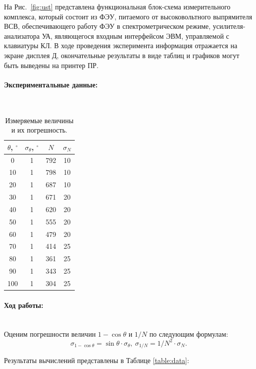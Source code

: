 \documentclass[a4paper, 12pt]{article}
\newcommand{\parag}[1]{\paragraph*{#1:}}
\begin{document}
На Рис.~\ref{fig:ust} представлена функциональная блок-схема измерительного комплекса, который состоит из ФЭУ, питаемого от высоковольтного выпрямителя ВСВ, обеспечивающего работу ФЭУ в спектрометрическом режиме, усилителя-анализатора УА, являющегося входным интерфейсом ЭВМ, управляемой с клавиатуры КЛ. В ходе проведения эксперимента информация отражается на экране дисплея Д, окончательные результаты в виде таблиц и графиков могут быть выведены на принтер ПР.

\parag {Экспериментальные данные} ~\\
    \begin{table}[h]
    \centering
        
    \begin{tabular}{|c|c|c|c|}
        \hline
        $\theta$, $^\circ$ & $\sigma_\theta$, $^\circ$ & $N$ & $\sigma_N$ \\ \hline


        0	&	1	&	792	&	10	 \\ \hline
        10	&	1	&	798	&	10	 \\ \hline
        20	&	1	&	687	&	10	 \\ \hline
        30	&	1	&	671	&	20	 \\ \hline
        40	&	1	&	620	&	20	 \\ \hline
        50	&	1	&	555	&	20	 \\ \hline
        60	&	1	&	479	&	20	 \\ \hline
        70	&	1	&	414	&	25	 \\ \hline
        80	&	1	&	361	&	25	 \\ \hline
        90	&	1	&	343	&	25	 \\ \hline
       100	&	1	&	304	&	25	 \\ \hline
       
         
    \end{tabular}

    \label{tab:data}
    \caption{Измеряемые величины и их погрешность.}
    \end{table}

\parag {Ход работы} ~\\
Оценим погрешности величин $1 - \cos \theta$ и $1/N$ по следующим формулам:
\begin{equation*}
    \sigma_{1-\cos \theta} = \sin \theta \cdot \sigma_\theta, \ \sigma_{1/N} = 1/N^2 \cdot \sigma_N.
\end{equation*}
    
Результаты вычислений представлены в Таблице \ref{table:data}:
\end{document}
